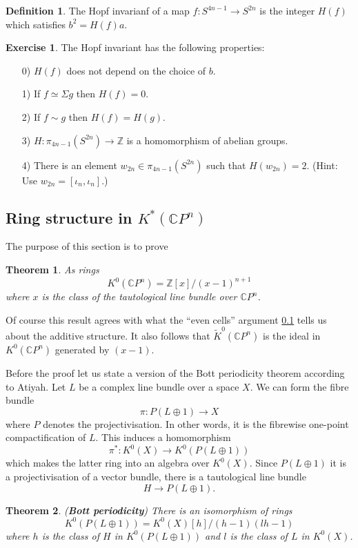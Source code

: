 \documentclass[a4paper,10pt]{article}
\theoremstyle{plain}%
\newtheorem{thm}{Theorem}
\theoremstyle{definition}
\newtheorem{defn}{Definition}
\newtheorem{exer}{Exercise}
\theoremstyle{remark}
\newcommand{\ZZ}{\mathbb{Z}}
\newcommand{\CC}{\mathbb{C}}
\newcommand{\KR}{\widetilde{K}}   %
\newcommand{\cp}{\CC P}   %
\newcommand{\susp}{\Sigma}  %
\newcommand{\htpyequiv}{\simeq}  %
\newcommand{\htpic}{\sim}  %
\begin{document}
\begin{defn}
The Hopf invarianf of a map $f:S^{4n-1}\to S^{2n}$ is the integer $H(f)$ which satisfies $b^2=H(f)a$.
\end{defn}

\begin{exer}
The Hopf invariant has the following properties:
\begin{itemize}
\item[0)] $H(f)$ does not depend on the choice of $b$.
\item[1)] If $f\htpyequiv \susp g$ then $H(f)=0$.
\item[2)] If $f\htpic g$ then $H(f)=H(g)$.
\item[3)] $H:\pi_{4n-1}(S^{2n})\to \ZZ$ is a homomorphism of abelian groups.
\item[4)] There is an element $w_{2n}\in \pi_{4n-1}(S^{2n})$ such that $H(w_{2n})=2$. (Hint: Use $w_{2n}=[\iota_n,\iota_n]$.)
\end{itemize}
\end{exer}


\subsection{Ring structure in $K^*(\cp^n)$}

The purpose of this section is to prove

\begin{thm}
As rings
$$
K^0(\cp^n)=\ZZ[x]/(x-1)^{n+1}
$$
where $x$ is the class of the tautological line bundle over $\cp^n$.
\end{thm}

Of course this result agrees with what the ``even cells'' argument \ref{} tells us about the additive structure. It also follows that $\KR^0(\cp^n)$ is the ideal in $K^0(\cp^n)$ generated by $(x-1)$.

Before the proof let us state a version of the Bott periodicity theorem according to Atiyah. Let $L$ be a complex line bundle over a space $X$. We can form the fibre bundle
$$\pi: P(L\oplus 1)\to X$$
where $P$ denotes the projectivisation. In other words, it is the fibrewise one-point compactification of $L$. This induces a homomorphism
$$\pi^*:K^0(X)\to K^0(P(L\oplus 1))$$
which makes the latter ring into an algebra over $K^0(X)$. Since $P(L\oplus 1)$ it is a projectivisation of a vector bundle, there is a tautological line bundle 
$$H\to P(L\oplus 1).$$

\begin{thm}({\bf Bott periodicity})
There is an isomorphism of rings
$$K^0(P(L\oplus 1))=K^0(X)[h]/(h-1)(lh-1)$$
where $h$ is the class of $H$ in $K^0(P(L\oplus 1))$ and $l$ is the class of $L$ in $K^0(X)$.
\end{thm}
\end{document}
